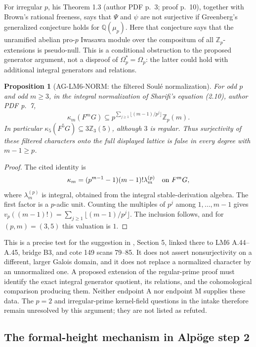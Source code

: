 \documentclass[11pt,a4paper]{article}
\newtheorem{proposition}{Proposition}
\begin{document}
For irregular $p$, his Theorem 1.3 (author PDF p.~3; proof p.~10),
together with Brown's rational freeness, says that $\Psi$ and
$\psi$ are not surjective if Greenberg's generalized conjecture
holds for $\mathbb Q(\mu_p)$. Here that conjecture says that the
unramified abelian pro-$p$ Iwasawa module over the compositum of
all $\mathbb Z_p$-extensions is pseudo-null. This is a conditional
obstruction to the proposed generator argument, not a disproof of
$\Omega_p^*=\Omega_p$: the latter could hold with additional
integral generators and relations.

\begin{proposition}[AG-LM6-NORM: the filtered Soulé normalization]
For odd $p$ and odd $m\ge3$, in the integral normalization of
Sharifi's equation (2.10), author PDF p.~7,
\[
 \kappa_m(F^mG)\subseteq
 p^{\sum_{j\ge1}\lfloor(m-1)/p^j\rfloor}\mathbb Z_p(m).
\]
In particular $\kappa_5(F^5G)\subseteq3\mathbb Z_3(5)$,
although $3$ is regular. Thus surjectivity of these filtered
characters onto the full displayed lattice is false in every
degree with $m-1\ge p$.
\end{proposition}
\begin{proof}
The cited identity is
\[
 \kappa_m=(p^{m-1}-1)(m-1)!\lambda_m^{(p)}
       \quad\hbox{on }F^mG,
\]
where $\lambda_m^{(p)}$ is integral, obtained from the integral
stable-derivation algebra. The first factor is a $p$-adic unit.
Counting the multiples of $p^j$ among $1,\ldots,m-1$ gives
$v_p((m-1)!)=\sum_{j\ge1}\lfloor(m-1)/p^j\rfloor$.
The inclusion follows, and for $(p,m)=(3,5)$ this valuation is $1$.
\end{proof}

This is a precise test for the suggestion in
,
Section 5, linked there to LM6 A.44--A.45, bridge B3, and cote 149
scans 79--85. It does not assert nonsurjectivity on a different,
larger Galois domain, and it does not replace a normalized character
by an unnormalized one. A proposed extension of the regular-prime
proof must identify the exact integral generator quotient, its
relations, and the cohomological comparison producing them.
Neither endpoint A nor endpoint M supplies these data. The
$p=2$ and irregular-prime kernel-field questions in the intake
therefore remain unresolved by this argument; they are not listed
as refuted.

\subsection{The formal-height mechanism in Alpöge step 2}
\label{ag:formal-height}
\end{document}
